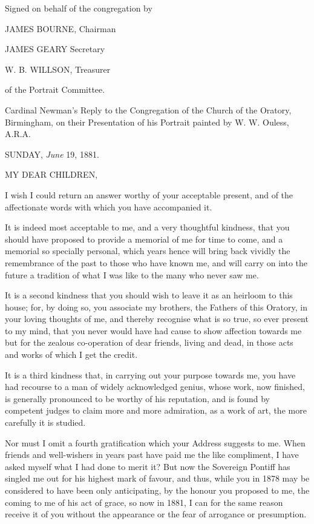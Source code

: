 Signed on behalf of the congregation by

JAMES BOURNE, Chairman

JAMES GEARY Secretary

W. B. WILLSON, Treasurer

of the Portrait Committee.

Cardinal Newman's Reply to the Congregation of the Church of the
Oratory, Birmingham, on their Presentation of his Portrait painted by
W. W. Ouless, A.R.A.

SUNDAY, \emph{June} 19, 1881.

MY DEAR CHILDREN,

I wish I could return an answer worthy of your acceptable present, and
of the affectionate words with which you have accompanied it.

It is indeed most acceptable to me, and a very thoughtful kindness,
that you should have proposed to provide a memorial of me for time to
come, and a memorial so specially personal, which years hence will
bring back vividly the remembrance of the past to those who have
known me, and will carry on into the future a tradition of what I was
like to the many who never saw me.

It is a second kindness that you should wish to leave it as an
heirloom to this house; for, by doing so, you associate my brothers,
the Fathers of this Oratory, in your loving thoughts of me, and
thereby recognise what is so true, so ever present to my mind, that
you never would have had cause to show affection towards me but for
the zealous co-operation of dear friends, living and dead, in those
acts and works of which I get the credit.

It is a third kindness that, in carrying out your purpose towards
me, you have had recourse to a man of widely acknowledged genius,
whose work, now finished, is generally pronounced to be worthy of his
reputation, and is found by competent judges to claim more and more
admiration, as a work of art, the more carefully it is studied.

Nor must I omit a fourth gratification which your Address suggests
to me. When friends and well-wishers in years past have paid me the
like compliment, I have asked myself what I had done to merit
it? But now the Sovereign Pontiff has singled me out for his highest
mark of favour, and thus, while you in 1878 may be considered to have
been only anticipating, by the honour you proposed to me, the coming
to me of his act of grace, so now in 1881, I can for the same reason
receive it of you without the appearance or the fear of arrogance or
presumption.

